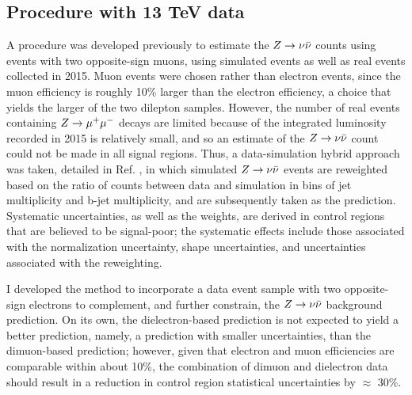 \subsection{Procedure with 13 TeV data} 
A procedure was developed previously \cite{CMS:2016nhb} to estimate the $Z\rightarrow \nu\bar{\nu}$ counts using events with two opposite-sign muons, using simulated events as well as real events collected in 2015. Muon events were chosen rather than electron events, since the muon efficiency is roughly 10\% larger than the electron efficiency, a choice that yields the larger of the two dilepton samples. However, the number of real events containing $Z\rightarrow \mu^+\mu^-$ decays are limited because of the integrated luminosity recorded in 2015 is relatively small, and so an estimate of the $Z\rightarrow \nu\bar{\nu}$ count could not be made in all signal regions. Thus, a data-simulation hybrid approach was taken, detailed in Ref. \cite{CMS:2016nhb}, in which simulated $Z\rightarrow \nu\bar{\nu}$ events are reweighted based on the ratio of counts between data and simulation in bins of jet multiplicity and b-jet multiplicity, and are subsequently taken as the prediction. Systematic uncertainties, as well as the weights, are derived in control regions that are believed to be signal-poor; the systematic effects include those associated with the normalization uncertainty, shape uncertainties, and uncertainties associated with the reweighting. 

I developed the method to incorporate a data event sample with two opposite-sign electrons to complement, and further constrain, the $Z\rightarrow \nu\bar{\nu}$ background prediction. On its own, the dielectron-based prediction is not expected to yield a better prediction, namely, a prediction with smaller uncertainties, than the dimuon-based prediction; however, given that electron and muon efficiencies are comparable within about 10\%, the combination of dimuon and dielectron data should result in a reduction in control region statistical uncertainties by $\approx$ 30\%. 

